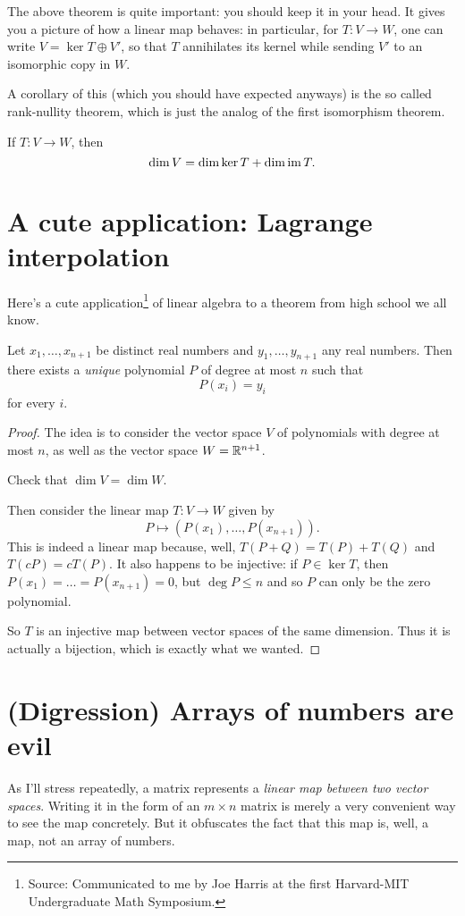 The above theorem is quite important: you should keep it in your head.
It gives you a picture of how a linear map behaves:
in particular, for $T : V \to W$, 
one can write $V = \ker T \oplus V'$,
so that $T$ annihilates its kernel while sending $V'$
to an isomorphic copy in $W$.

A corollary of this (which you should have expected anyways) is the so called rank-nullity theorem,
which is just the analog of the first isomorphism theorem.
\begin{theorem}
	\label{thm:rank_nullity}
	If $T : V \to W$, then 
	\[ \dim V = \dim \ker T + \dim \operatorname{im} T. \]
\end{theorem}

\section{A cute application: Lagrange interpolation}
Here's a cute application\footnote{Source: Communicated to me
by Joe Harris at the first Harvard-MIT Undergraduate Math Symposium.}
of linear algebra to a theorem from high school we all know.
\begin{theorem}
	Let $x_1, \dots, x_{n+1}$ be distinct real numbers
	and $y_1, \dots, y_{n+1}$ any real numbers.
	Then there exists a \emph{unique} polynomial $P$ of degree at most $n$
	such that \[ P(x_i) = y_i \] for every $i$.
\end{theorem}
\begin{proof}
	The idea is to consider the vector space $V$ of polynomials with degree at most $n$,
	as well as the vector space $W = \mathbb R^{n+1}$.
	\begin{ques}
		Check that $\dim V = \dim W$.
	\end{ques}
	Then consider the linear map $T : V \to W$ given by
	\[ P \mapsto \left( P(x_1), \dots, P(x_{n+1}) \right). \]
	This is indeed a linear map because,
	well, $T(P+Q) = T(P)+T(Q)$ and $T(cP) = cT(P)$.
	It also happens to be injective: if $P \in \ker T$,
	then $P(x_1) = \dots = P(x_{n+1}) = 0$,
	but $\deg P \le n$ and so $P$ can only be the zero polynomial.
	
	So $T$ is an injective map between vector spaces of the same dimension.
	Thus it is actually a bijection, which is exactly what we wanted.
\end{proof}

\section{(Digression) Arrays of numbers are evil}
\label{sec:basis_evil}
As I'll stress repeatedly, a matrix represents a \emph{linear map between two vector spaces}.
Writing it in the form of an $m \times n$ matrix is merely a very convenient way to see the map concretely.
But it obfuscates the fact that this map is, well, a map, not an array of numbers.

